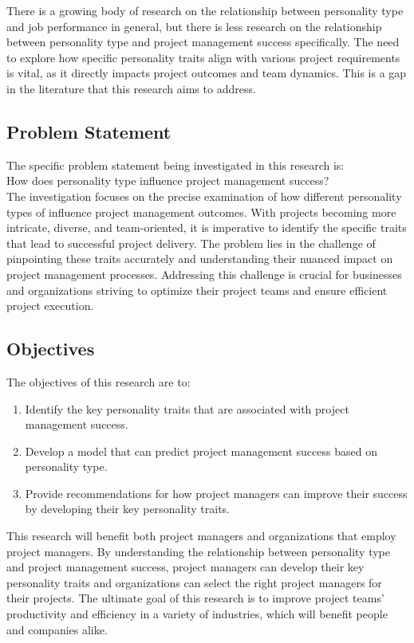 \documentclass[a4Paper]{article}
\begin{document}
There is a growing body of research on the relationship between personality type and job performance in general, but there is less research on the relationship between personality type and project management success specifically. The need to explore how specific personality traits align with various project requirements is vital, as it directly impacts project outcomes and team dynamics. This is a gap in the literature that this research aims to address.

\subsection{Problem Statement}
The specific problem statement being investigated in this research is:\\

How does personality type influence project management success?\\

The investigation focuses on the precise examination of how different personality types of influence project management outcomes. With projects becoming more intricate, diverse, and team-oriented, it is imperative to identify the specific traits that lead to successful project delivery. The problem lies in the challenge of pinpointing these traits accurately and understanding their nuanced impact on project management processes. Addressing this challenge is crucial for businesses and organizations striving to optimize their project teams and ensure efficient project execution.

\subsection{Objectives}
The objectives of this research are to:
\begin{enumerate}
    \item Identify the key personality traits that are associated with project management success.
    \item Develop a model that can predict project management success based on personality type.
    \item Provide recommendations for how project managers can improve their success by developing their key personality traits.
\end{enumerate}
This research will benefit both project managers and organizations that employ project managers. By understanding the relationship between personality type and project management success, project managers can develop their key personality traits and organizations can select the right project managers for their projects. The ultimate goal of this research is to improve project teams' productivity and efficiency in a variety of industries, which will benefit people and companies alike.
\end{document}
